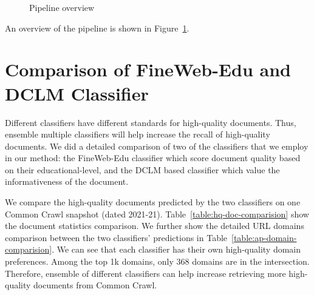 \documentclass[11pt]{article}
\begin{document}
\begin{figure}[htbp]
\caption{Pipeline overview}
\label{fig:pipelineoverview}
\end{figure}

An overview of the pipeline is shown in Figure~\ref{fig:pipelineoverview}.

\section{Comparison of FineWeb-Edu and DCLM Classifier}
\label{sec:appendix-1}
Different classifiers have different standards for high-quality documents. Thus, ensemble multiple classifiers will help increase the recall of high-quality documents. We did a detailed comparison of two of the classifiers that we employ in our method: the FineWeb-Edu classifier which score document quality based on their educational-level, and the DCLM based classifier which value the informativeness of the document. 

We compare the high-quality documents predicted by the two classifiers on one Common Crawl snapshot (dated 2021-21). Table~\ref{table:hq-doc-comparision} show the document statistics comparison. We further show the detailed URL domains comparison between the two classifiers' predictions in Table~\ref{table:ap-domain-comparision}. We can see that each classifier has their own high-quality domain preferences. Among the top 1k domains, only 368 domains are in the intersection. Therefore, ensemble of different classifiers can help increase retrieving more high-quality documents from Common Crawl.
\end{document}
